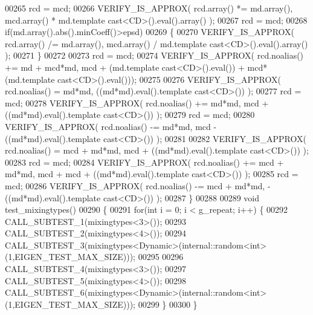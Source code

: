\begin{DoxyCode}
00265   rcd = mcd;
00266   VERIFY\_IS\_APPROX( rcd.array() *= md.array(), mcd.array() * md.template cast<CD>().eval().array() );
00267   rcd = mcd;
00268   \textcolor{keywordflow}{if}(md.array().abs().minCoeff()>epsd)
00269   \{
00270     VERIFY\_IS\_APPROX( rcd.array() /= md.array(), mcd.array() / md.template cast<CD>().eval().array() );
00271   \}
00272 
00273   rcd = mcd;
00274   VERIFY\_IS\_APPROX( rcd.noalias() += md + mcd*md, mcd + (md.template cast<CD>().eval()) + mcd*(md.template 
      cast<CD>().eval()));
00275 
00276   VERIFY\_IS\_APPROX( rcd.noalias()  = md*md,       ((md*md).eval().template cast<CD>()) );
00277   rcd = mcd;
00278   VERIFY\_IS\_APPROX( rcd.noalias() += md*md, mcd + ((md*md).eval().template cast<CD>()) );
00279   rcd = mcd;
00280   VERIFY\_IS\_APPROX( rcd.noalias() -= md*md, mcd - ((md*md).eval().template cast<CD>()) );
00281 
00282   VERIFY\_IS\_APPROX( rcd.noalias()  = mcd + md*md,       mcd + ((md*md).eval().template cast<CD>()) );
00283   rcd = mcd;
00284   VERIFY\_IS\_APPROX( rcd.noalias() += mcd + md*md, mcd + mcd + ((md*md).eval().template cast<CD>()) );
00285   rcd = mcd;
00286   VERIFY\_IS\_APPROX( rcd.noalias() -= mcd + md*md,           - ((md*md).eval().template cast<CD>()) );
00287 \}
00288 
00289 \textcolor{keywordtype}{void} test\_mixingtypes()
00290 \{
00291   \textcolor{keywordflow}{for}(\textcolor{keywordtype}{int} i = 0; i < g\_repeat; i++) \{
00292     CALL\_SUBTEST\_1(mixingtypes<3>());
00293     CALL\_SUBTEST\_2(mixingtypes<4>());
00294     CALL\_SUBTEST\_3(mixingtypes<Dynamic>(internal::random<int>(1,EIGEN\_TEST\_MAX\_SIZE)));
00295 
00296     CALL\_SUBTEST\_4(mixingtypes<3>());
00297     CALL\_SUBTEST\_5(mixingtypes<4>());
00298     CALL\_SUBTEST\_6(mixingtypes<Dynamic>(internal::random<int>(1,EIGEN\_TEST\_MAX\_SIZE)));
00299   \}
00300 \}
\end{DoxyCode}
